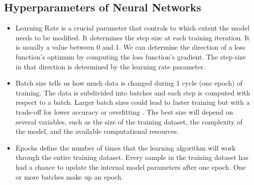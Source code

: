 \subsection*{Hyperparameters of Neural Networks}
\begin{itemize}
	\item Learning Rate is a crucial parameter that controls to which extent the model needs to be modified. It determines the step size at each training iteration. It is usually a value between 0 and 1. We can determine the direction of a loss function's optimum by computing the loss function's gradient. The step size in that direction is determined by the learning rate parameter.
	\item Batch size tells us how much data is changed during 1 cycle (one epoch) of training. The data is subdivided into batches and each step is computed with respect to a batch. Larger batch sizes could lead to faster training but with a trade-off for lower accuracy or overfitting \cite{DBLP:journals/corr/abs-2006-08517}. The best size will depend on several variables, such as the size of the training dataset, the complexity of the model, and the available computational resources.
	\item Epochs define the number of times that the learning algorithm will work through the entire training dataset. Every sample in the training dataset has had a chance to update the internal model parameters after one epoch. One or more batches make up an epoch.
\end{itemize}
